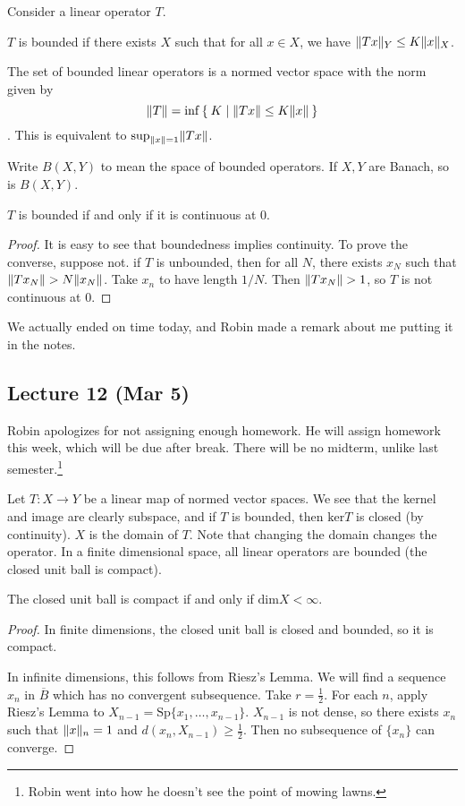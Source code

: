 \documentclass[10pt, twoside]{article}
\begin{document}
    Consider a linear operator $T$.
    \begin{defn}
        $T$ is bounded if there exists $X$ such that for all $x \in X$, we have $\lVert Tx\rVert_Y \leq K \lVert x\rVert_X$.
    \end{defn}

    The set of bounded linear operators is a normed vector space with the norm given by \[\lVert T\rVert= \inf\Set{K | \lVert Tx\rVert \leq K \lVert x\rVert}\]. This is equivalent to $\sup_{\lVert x\rVert = 1} \lVert Tx\rVert$.

    Write $B(X,Y)$ to mean the space of bounded operators. If $X,Y$ are Banach, so is $B(X,Y)$.

    \begin{thm}
        $T$ is bounded if and only if it is continuous at $0$.
        \begin{proof}
            It is easy to see that boundedness implies continuity. To prove the converse, suppose not. if $T$ is unbounded, then for all $N$, there exists $x_N$ such that $\lVert Tx_N\rVert > N \lVert x_N\rVert$. Take $x_n$ to have length $1/N$. Then $\lVert Tx_N\rVert > 1$, so $T$ is not continuous at $0$.
        \end{proof}
    \end{thm}
    We actually ended on time today, and Robin made a remark about me putting it in the notes.

    \subsection{Lecture 12 (Mar 5)}
    Robin apologizes for not assigning enough homework. He will assign homework this week, which will be due after break. There will be no midterm, unlike last semester.\footnote{Robin went into how he doesn't see the point of mowing lawns.}
    
    Let $T:X \to Y$ be a linear map of normed vector spaces. We see that the kernel and image are clearly subspace, and if $T$ is bounded, then $\mathrm{ker} T$ is closed (by continuity). $X$ is the domain of $T$. Note that changing the domain changes the operator. In a finite dimensional space, all linear operators are bounded (the closed unit ball is compact).

    \begin{lem}
        The closed unit ball is compact if and only if $\mathrm{dim} X < \infty$.
        \begin{proof}
            In finite dimensions, the closed unit ball is closed and bounded, so it is compact.

            In infinite dimensions, this follows from Riesz's Lemma. We will find a sequence $x_n$ in $\overline{B}$ which has no convergent subsequence. Take $r = \frac{1}{2}$. For each $n$, apply Riesz's Lemma to $X_{n-1} = \mathrm{Sp}\{x_1, \ldots, x_{n-1}\}$. $X_{n-1}$ is not dense, so there exists $x_n$ such that $\lVert x\rVert_n = 1$ and $d(x_n, X_{n-1}) \geq \frac{1}{2}$. Then no subsequence of $\{x_n\}$ can converge.
        \end{proof}
    \end{lem}
\end{document}
